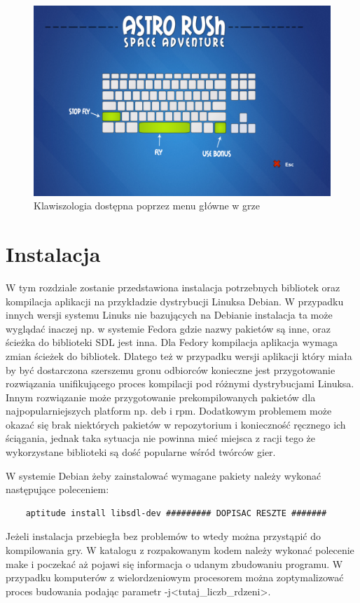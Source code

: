 \begin{figure}[h]
    \centering
    \includegraphics[width=429px]{./Pictures/menu3.png}
    \caption{Klawiszologia dostępna poprzez menu główne w grze}
\end{figure}


\section{Instalacja}
W tym rozdziale zostanie przedstawiona instalacja potrzebnych bibliotek oraz kompilacja aplikacji na przykładzie dystrybucji Linuksa Debian. W przypadku innych wersji systemu Linuks nie bazujących na Debianie instalacja ta może wyglądać inaczej np. w systemie Fedora gdzie nazwy pakietów są inne, oraz ścieżka do biblioteki SDL jest inna. Dla Fedory kompilacja aplikacja wymaga zmian ścieżek do bibliotek. Dlatego też w przypadku wersji aplikacji który miała by być dostarczona szerszemu gronu odbiorców konieczne jest przygotowanie rozwiązania unifikującego proces kompilacji pod różnymi dystrybucjami Linuksa. Innym rozwiązanie może przygotowanie prekompilowanych pakietów dla najpopularniejszych platform np. deb i rpm. Dodatkowym problemem może okazać się brak niektórych pakietów w repozytorium i konieczność ręcznego ich ściągania, jednak taka sytuacja nie powinna mieć miejsca z racji tego że wykorzystane biblioteki są dość popularne wśród twórców gier. 

W systemie Debian żeby zainstalować wymagane pakiety należy wykonać następujące poleceniem:
\begin{verbatim}
	aptitude install libsdl-dev ######### DOPISAC RESZTE #######
\end{verbatim}

Jeżeli instalacja przebiegła bez problemów to wtedy można przystąpić do kompilowania gry.
W katalogu z rozpakowanym kodem należy wykonać polecenie make i poczekać aż pojawi się informacja o udanym zbudowaniu programu. W przypadku komputerów z wielordzeniowym procesorem można zoptymalizować proces budowania podając parametr -j<tutaj\_liczb\_rdzeni>.

